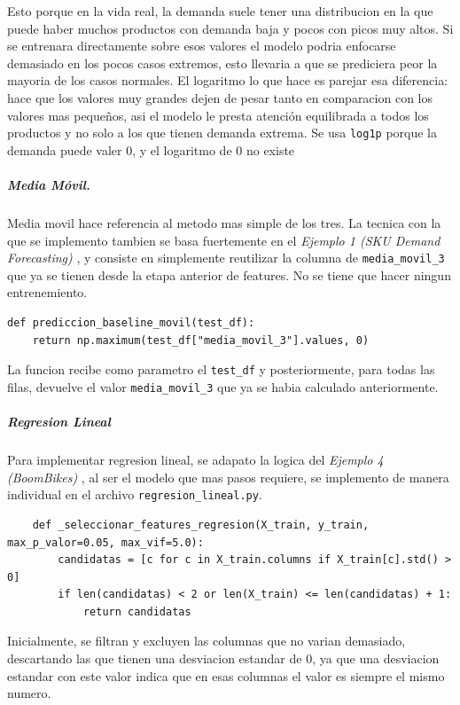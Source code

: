 Esto porque en la vida real, la demanda suele tener una distribucion en la que puede haber muchos productos con demanda baja y pocos con picos muy altos. Si se entrenara directamente sobre esos valores el modelo podria enfocarse demasiado en los pocos casos extremos, esto llevaria a que se prediciera peor la mayoria de los casos normales. El logaritmo lo que hace es parejar esa diferencia: hace que los valores muy grandes dejen de pesar tanto en comparacion con los valores mas pequeños, asi el modelo le presta atención equilibrada a todos los productos y no solo a los que tienen demanda extrema. Se usa \texttt{log1p} porque la demanda puede valer 0, y el logaritmo de 0 no existe


\subparagraph{Media Móvil.}

Media movil hace referencia al metodo mas simple de los tres. La tecnica con la que se implemento tambien se basa fuertemente en el \textit{Ejemplo 1 (SKU Demand Forecasting)} \cite{ejemplo1_demandforecast}, y consiste en simplemente reutilizar la columna de \texttt{media\_movil\_3} que ya se tienen desde la etapa anterior de features. No se tiene que hacer ningun entrenemiento. 

\begin{verbatim}
def prediccion_baseline_movil(test_df):
    return np.maximum(test_df["media_movil_3"].values, 0)
\end{verbatim}

La funcion recibe como parametro el \texttt{test\_df} y posteriormente, para todas las filas, devuelve el valor \texttt{media\_movil\_3} que ya se habia calculado anteriormente.


\subparagraph{Regresion Lineal}

Para implementar regresion lineal, se adapato la logica del \textit{Ejemplo 4 (BoomBikes)} \cite{ejemplo4_boombikes}, al ser el modelo que mas pasos requiere, se implemento de manera individual en el archivo \texttt{regresion\_lineal.py}.

\begin{verbatim}
    def _seleccionar_features_regresion(X_train, y_train, max_p_valor=0.05, max_vif=5.0):
        candidatas = [c for c in X_train.columns if X_train[c].std() > 0]
        if len(candidatas) < 2 or len(X_train) <= len(candidatas) + 1:
            return candidatas
\end{verbatim}

Inicialmente, se filtran y excluyen las columnas que no varian demasiado, descartando las que tienen una desviacion estandar de 0, ya que una desviacion estandar con este valor indica que en esas columnas el valor es siempre el mismo numero.


